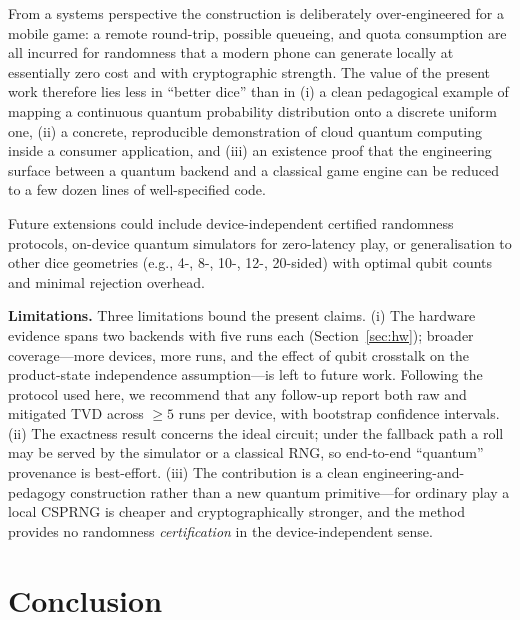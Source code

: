 \documentclass[journal]{IEEEtran}
\begin{document}
From a systems perspective the construction is deliberately over-engineered for a mobile game: a remote round-trip, possible queueing, and quota consumption are all incurred for randomness that a modern phone can generate locally at essentially zero cost and with cryptographic strength. The value of the present work therefore lies less in ``better dice'' than in (i) a clean pedagogical example of mapping a continuous quantum probability distribution onto a discrete uniform one, (ii) a concrete, reproducible demonstration of cloud quantum computing inside a consumer application, and (iii) an existence proof that the engineering surface between a quantum backend and a classical game engine can be reduced to a few dozen lines of well-specified code.

Future extensions could include device-independent certified randomness protocols, on-device quantum simulators for zero-latency play, or generalisation to other dice geometries (e.g., 4-, 8-, 10-, 12-, 20-sided) with optimal qubit counts and minimal rejection overhead.

\textbf{Limitations.} Three limitations bound the present claims. (i) The hardware evidence spans two backends with five runs each (Section~\ref{sec:hw}); broader coverage---more devices, more runs, and the effect of qubit crosstalk on the product-state independence assumption---is left to future work. Following the protocol used here, we recommend that any follow-up report both raw and mitigated TVD across $\ge\!5$ runs per device, with bootstrap confidence intervals. (ii) The exactness result concerns the ideal circuit; under the fallback path a roll may be served by the simulator or a classical RNG, so end-to-end ``quantum'' provenance is best-effort. (iii) The contribution is a clean engineering-and-pedagogy construction rather than a new quantum primitive---for ordinary play a local CSPRNG is cheaper and cryptographically stronger, and the method provides no randomness \emph{certification} in the device-independent sense.

\section{Conclusion}
\end{document}
